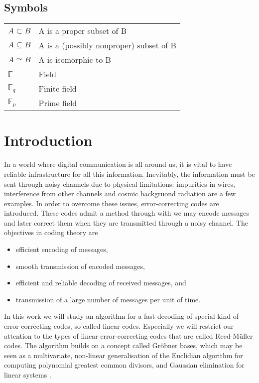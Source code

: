 \documentclass[english,bachelor]{liumaiex}
\begin{document}
\section*{Symbols}
\begin{tabular}{l l}
$A \subset B$ & A is a proper subset of B \\
$A \subseteq B$ & A is a (possibly nonproper) subset of B \\
$A \cong B$ & A is isomorphic to B \\
$\mathbb{F}$ & Field \\
$\mathbb{F}_q$ & Finite field \\
$\mathbb{F}_p$ & Prime field
\end{tabular}


\tableofcontents



\mainmatter

\chapter{Introduction}
In a world where digital communication is all around us, it is vital to have reliable infrastructure for all this information. Inevitably, the information must be sent through noisy channels due to physical limitations: impurities in wires, interference from other channels and cosmic backgruond radiation are a few examples. In order to overcome these issues, error-correcting codes are introduced. These codes admit a method through with we may encode messages and later correct them when they are transmitted through a noisy channel. The objectives in coding theory are
\begin{itemize}
\item efficient encoding of messages,
\item smooth transmission of encoded messages,
\item efficient and reliable decoding of received messages, and
\item transmission of a large number of messages per unit of time.
\end{itemize}
In this work we will study an algorithm for a fast decoding of special kind of error-correcting codes, so called linear codes. Especially we will restrict our attention to the types of linear error-correcting codes that are called Reed-M{\"u}ller codes. The algorithm builds on a concept called Gröbner bases, which may be seen as a multivariate, non-linear generalisation of the Euclidian algorithm for computing polynomial greatest common divisors, and Gaussian elimination for linear systems \cite{lazard83}.
\end{document}

